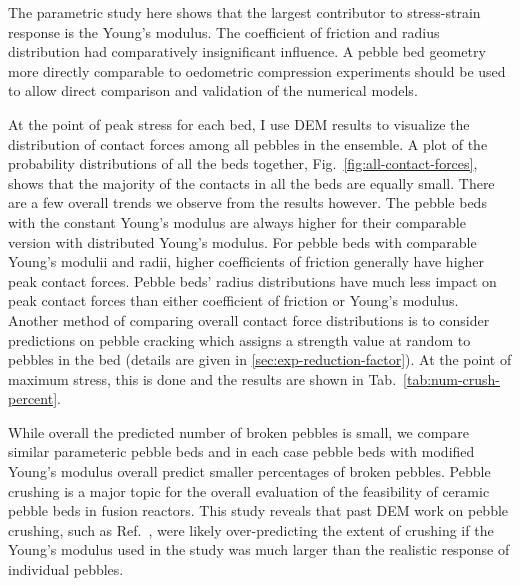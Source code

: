 The parametric study here shows that the largest contributor to stress-strain response is the Young’s modulus. The coefficient of friction and radius distribution had comparatively insignificant influence. A pebble bed geometry more directly comparable to oedometric compression experiments should be used to allow direct comparison and validation of the numerical models.


At the point of peak stress for each bed, I use DEM results to visualize the distribution of contact forces among all pebbles in the ensemble. A plot of the probability distributions of all the beds together, Fig.~\ref{fig:all-contact-forces}, shows that the majority of the contacts in all the beds are equally small. There are a few overall trends we observe from the results however. The pebble beds with the constant Young's modulus are always higher for their comparable version with distributed Young's modulus. For pebble beds with comparable Young's modulii and radii, higher coefficients of friction generally have higher peak contact forces. Pebble beds' radius distributions have much less impact on peak contact forces than either coefficient of friction or Young’s modulus. Another method of comparing overall contact force distributions is to consider predictions on pebble cracking which assigns a strength value at random to pebbles in the bed (details are given in \cref{sec:exp-reduction-factor}). At the point of maximum stress, this is done and the results are shown in Tab.~\ref{tab:num-crush-percent}.

While overall the predicted number of broken pebbles is small, we compare similar parameteric pebble beds and in each case pebble beds with modified Young’s modulus overall predict smaller percentages of broken pebbles. Pebble crushing is a major topic for the overall evaluation of the feasibility of ceramic pebble beds in fusion reactors. This study reveals that past DEM work on pebble crushing, such as Ref.~\cite{Annabattula2012a,Annabattula2014,Zhao2013}, were likely over-predicting the extent of crushing if the Young's modulus used in the study was much larger than the realistic response of individual pebbles.

